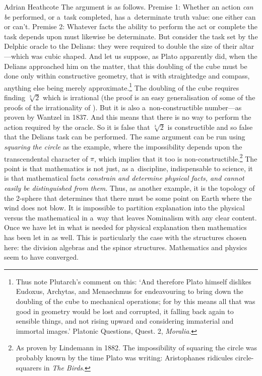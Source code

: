\begin{artengenv}{Adrian Heathcote}
The argument is as follows. Premise 1: Whether an action \textit{can be} performed, or a~task completed, has a~determinate truth value: one either can or can't. Premise 2: Whatever facts the ability to perform the act or complete the task depends upon must likewise  be determinate.  But consider the task set by the Delphic oracle to the Delians: they were required to double the size of their altar---which was cubic shaped. And let us suppose, as Plato apparently did, when the Delians approached him on the matter, that this doubling of the cube must be done only within constructive geometry, that is with straightedge and compass, anything else being merely approximate.\footnote{Thus note Plutarch's comment on this: `And therefore Plato himself dislikes Eudoxus, Archytas, and Menaechmus for endeavouring to bring down the doubling of the cube to mechanical operations; for by this means all that was good in geometry would be lost and corrupted, it falling back again to sensible things, and not rising upward and considering immaterial and immortal images\xelip .' Platonic Questions, Quest. 2, \textit{Moralia}.} The doubling of the cube requires finding $\sqrt[3]{2}$ which is irrational (the proof is an easy generalisation of some of the proofs of the irrationality of \sqrtwo). But it is also a~non-constructible number---as proven by Wantzel in 1837. And this means that there is no way to perform the action required by the oracle. So it is false that $\sqrt[3]{2}$ is constructible and so false that the Delians task can be performed. The same argument can be run using \textit{squaring the circle} as the example, where the impossibility depends upon the transcendental character of $\pi$, which implies that it too is non-constructible.\footnote{As proven by Lindemann in 1882. The impossibility of squaring the circle was probably known by the time Plato was writing: Aristophanes ridicules circle-squarers in \textit{The Birds}.} The point is that mathematics is not just, as a~discipline, indispensable to science, it is that mathematical facts \textit{constrain and determine physical facts, and cannot easily be distinguished from them}. Thus, as another example, it is the topology of the 2-sphere that determines that there must be some point on Earth where the wind does not blow. It is impossible to partition explanation into the physical versus the mathematical in a~way that leaves Nominalism with any clear content. Once we have let in what is needed for physical explanation then mathematics has been let in as well. This is particularly the case with the structures chosen here: the division algebras and the spinor structures. Mathematics and physics seem to have converged.



\end{artengenv}

